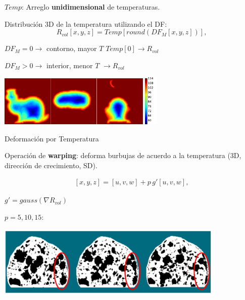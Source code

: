 \documentclass[spanish,unknownkeysallowed,10pt]{beamer}
\begin{document}
%


\begin{frame}

$Temp$: Arreglo \textbf{unidimensional} de temperaturas.


Distribución 3D de la temperatura utilizando el DF:
\begin{equation*}
\displaystyle R_{vol}[x,y,z] = Temp[ round( DF_{M}[x,y,z] ) ], 
\end{equation*}

$DF_{M} = 0 \rightarrow$ contorno, mayor $T$ $Temp[0] \rightarrow R_{vol}$

$DF_{M} > 0 \rightarrow$ interior, menor $T$  $\rightarrow R_{vol}$

\centerline{\includegraphics[width=8cm]{../figures/tempsbunny}}
\end{frame}

\begin{frame}{Deformación por Temperatura}

Operación de \textbf{warping}: deforma burbujas de acuerdo a la temperatura (3D, dirección de crecimiento, SD).

\begin{align*}
\displaystyle
[x,y,z] = [u,v,w] + p\, g'[u,v,w],
\end{align*}

$g' = gauss(\nabla R_{vol})$

$p = 5,10,15$:
\centerline{\includegraphics[width=11cm]{../figures/parameterp}}

\end{frame}
\end{document}
